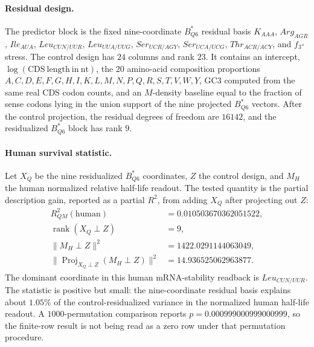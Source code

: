 \paragraph{Residual design.}
The predictor block is the fixed nine-coordinate $B^{\ast}_{Q6}$ residual basis
$K_{AAA}$, $Arg_{AGR}$, $Ile_{AUA}$, $Leu_{CUN/UUR}$, $Leu_{UUA/UUG}$, $Ser_{UCR/AGY}$, $Ser_{UCA/UCG}$, $Thr_{ACR/ACY}$, and $f_3$-stress.  The control design has $24$ columns and rank $23$.  It contains an intercept, $\log(\mathrm{CDS\ length\ in\ nt})$, the $20$ amino-acid composition proportions $A,C,D,E,F,G,H,I,K,L,M,N,P,Q,R,S,T,V,W,Y$, GC3 computed from the same real CDS codon counts, and an $M$-density baseline equal to the fraction of sense codons lying in the union support of the nine projected $B^{\ast}_{Q6}$ vectors.  After the control projection, the residual degrees of freedom are $16142$, and the residualized $B^{\ast}_{Q6}$ block has rank $9$.

\paragraph{Human survival statistic.}
Let $X_Q$ be the nine residualized $B^{\ast}_{Q6}$ coordinates, $Z$ the control design, and $M_H$ the human normalized relative half-life readout.  The tested quantity is the partial description gain, reported as a partial $R^2$, from adding $X_Q$ after projecting out $Z$:
$$
\begin{aligned}
R^2_{QM}(\mathrm{human}) &= 0.010503670362051522,\\
\operatorname{rank}(X_Q \perp Z) &= 9,\\
\|M_H \perp Z\|^2 &= 1422.0291144063049,\\
\|\operatorname{Proj}_{X_Q \perp Z}(M_H \perp Z)\|^2 &= 14.936525062963877.
\end{aligned}
$$
The dominant coordinate in this human mRNA-stability readback is $Leu_{CUN/UUR}$.  The statistic is positive but small: the nine-coordinate residual basis explains about $1.05\%$ of the control-residualized variance in the normalized human half-life readout.  A $1000$-permutation comparison reports $p=0.000999000999000999$, so the finite-row result is not being read as a zero row under that permutation procedure.

